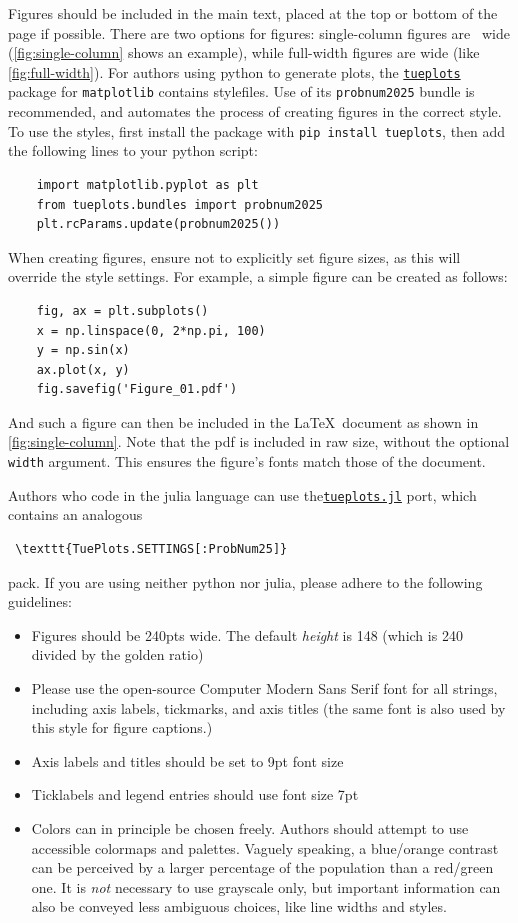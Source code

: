 \documentclass{article}
\begin{document}
Figures should be included in the main text, placed at the top or bottom of the page if possible. There are two options for figures: single-column figures are \the\columnwidth~wide (\cref{fig:single-column} shows an example), while full-width figures are \the\textwidth wide (like \cref{fig:full-width}). For authors using python to generate plots, the \href{https://github.com/pnkraemer/tueplots/}{\texttt{tueplots}} package for \texttt{matplotlib} contains stylefiles. Use of its \texttt{probnum2025} bundle is recommended, and automates the process of creating figures in the correct style. To use the styles, first install the package with \texttt{pip install tueplots}, then add the following lines to your python script:
\begin{verbatim}
    import matplotlib.pyplot as plt
    from tueplots.bundles import probnum2025
    plt.rcParams.update(probnum2025())
\end{verbatim}
When creating figures, ensure not to explicitly set figure sizes, as this will override the style settings. For example, a simple figure can be created as follows:
\begin{verbatim}
    fig, ax = plt.subplots()
    x = np.linspace(0, 2*np.pi, 100)
    y = np.sin(x)
    ax.plot(x, y)
    fig.savefig('Figure_01.pdf')
\end{verbatim}
And such a figure can then be included in the \LaTeX\ document as shown in \cref{fig:single-column}. Note that the pdf is included in raw size, without the optional \texttt{width} argument. This ensures the figure's fonts match those of the document.

Authors who code in the julia language can use the\newline \href{https://github.com/nathanaelbosch/TuePlots.jl}{\texttt{tueplots.jl}} port, which contains an analogous
\begin{verbatim}
 \texttt{TuePlots.SETTINGS[:ProbNum25]}
\end{verbatim} pack. If you are using neither python nor julia, please adhere to the following guidelines:
\begin{itemize}
    \item Figures should be 240pts wide. The default \emph{height} is 148 (which is 240 divided by the golden ratio)
    \item Please use the open-source \textsf{Computer Modern Sans Serif} font for all strings, including axis labels, tickmarks, and axis titles (the same font is also used by this style for figure captions.)
    \item Axis labels and titles should be set to 9pt font size 
    \item Ticklabels and legend entries should use font size 7pt
    \item Colors can in principle be chosen freely. Authors should attempt to use accessible colormaps and palettes. Vaguely speaking, a blue/orange contrast can be perceived by a larger percentage of the population than a red/green one. It is \emph{not} necessary to use grayscale only, but important information can also be conveyed less ambiguous choices, like line widths and styles.
\end{itemize}
\end{document}
